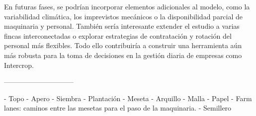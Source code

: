 En futuras fases, se podrían incorporar elementos adicionales al modelo, como la variabilidad climática,
los imprevistos mecánicos o la disponibilidad parcial de maquinaria y personal.
También sería interesante extender el estudio a varias fincas interconectadas o explorar estrategias de contratación y rotación del personal más flexibles.
Todo ello contribuiría a construir una herramienta aún más robusta para la toma de decisiones en la gestión diaria de empresas como Intercrop.

\newpage
------------------------------

- Topo
- Apero
- Siembra
- Plantación
- Meseta
- Arquillo
- Malla
- Papel
- Farm lanes: caminos entre las mesetas para el paso de la maquinaria.
- Semillero
